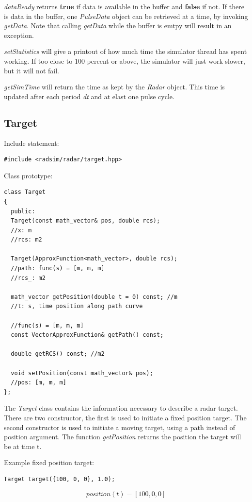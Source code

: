 \documentclass[letterpaper]{book}
\begin{document}
\textit{dataReady} returns \textbf{true} if data is available in the buffer and \textbf{false} if not. If there is data in the buffer, one \textit{PulseData} object can be retrieved at a time, by invoking \textit{getData}. Note that calling \textit{getData} while the buffer is emtpy will result in an exception. 

\textit{setStatistics} will give a printout of how much time the simulator thread has spent working. If too close to 100 percent or above, the simulator will just work slower, but it will not fail. 

\textit{getSimTime} will return the time as kept by the \textit{Radar} object. This time is updated after each period \textit{dt} and at elast one pulse cycle. 


\subsection{Target}
Include statement:
\begin{lstlisting}
#include <radsim/radar/target.hpp>
\end{lstlisting}
Class prototype:
\begin{lstlisting}
class Target
{
  public:
  Target(const math_vector& pos, double rcs);
  //x: m
  //rcs: m2

  Target(ApproxFunction<math_vector>, double rcs);
  //path: func(s) = [m, m, m]
  //rcs_: m2

  math_vector getPosition(double t = 0) const; //m
  //t: s, time position along path curve

  //func(s) = [m, m, m]
  const VectorApproxFunction& getPath() const;

  double getRCS() const; //m2

  void setPosition(const math_vector& pos);
  //pos: [m, m, m]
};
\end{lstlisting}
The \textit{Target} class contains the information necessary to describe a radar target. There are two constructor, the first is used to initiate a fixed position target. The second constructor is used to initiate a moving target, using a path instead of position argument. The function \textit{getPosition} returns the position the target will be at time t. 

Example fixed position target:
\begin{lstlisting}
Target target({100, 0, 0}, 1.0);
\end{lstlisting}
\begin{equation}
position(t) = [100, 0, 0]
\end{equation}
\end{document}
